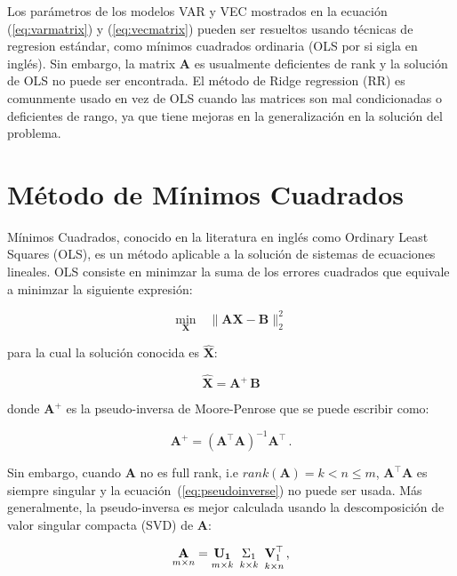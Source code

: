 Los parámetros de los modelos VAR y VEC mostrados en la ecuación
(\ref{eq:varmatrix}) y (\ref{eq:vecmatrix}) pueden ser resueltos usando
técnicas de regresion estándar, como mínimos cuadrados ordinaria (OLS por si
sigla en inglés). Sin embargo, la matrix $\mathbf{A}$ es usualmente deficientes
de rank y la solución de OLS no puede ser encontrada.  El método de Ridge
regression (RR) es comunmente usado en vez de OLS cuando las matrices son mal
condicionadas o deficientes de rango, ya que tiene mejoras en la generalización
en la solución del problema.

\section{Método de Mínimos Cuadrados}
Mínimos Cuadrados, conocido en la literatura en inglés como Ordinary Least Squares (OLS), 
es un método aplicable a la solución de sistemas de ecuaciones lineales. OLS consiste en minimzar
la suma de los errores cuadrados que equivale a minimzar la siguiente expresión:

\begin{equation}
\label{eq:regressionproblem}
\underset{\mathbf{X}}{\text{min}} \quad \| \mathbf{A}\mathbf{\mathbf{X}} - \mathbf{B} \|_2^2
\end{equation}

\noindent para la cual la solución conocida es $\hat{\mathbf{X}}$:

\begin{equation}
\label{eq:MP}
\hat{\mathbf{X}}=\mathbf{A}^{\!\!+}\,\mathbf{B}
\end{equation}

\noindent donde $\mathbf{A}^{\!\!+}$ es la pseudo-inversa de Moore-Penrose que se puede escribir como:

\begin{equation}
\label{eq:pseudoinverse}
\mathbf{A}^{\!\!+}= (\mathbf{A}^{\!\!\top} \mathbf{A})^{-1}\mathbf{A}^{\!\!\top} \, .
\end{equation}

Sin embargo, cuando $\mathbf{A}$ no es full rank, i.e 
$rank(\mathbf{A})=k <  n \leq m$, $\mathbf{A}^\top \mathbf{A}$ es siempre singular
y la ecuación~(\ref{eq:pseudoinverse}) no puede ser usada. Más generalmente,
la pseudo-inversa es mejor calculada usando la descomposición de valor singular compacta (SVD)
de $\mathbf{A}$:

\begin{equation}
    \label{eq:compactsvd}
    \underset{m \times n}{\mathbf{A}}=
    \underset{m \times k}{\mathbf{U_1}} \enskip
    \underset{k \times k}{\Sigma_1} \enskip
    \underset{k \times n}{\mathbf{V}_1^{\top}} \, ,
\end{equation}


